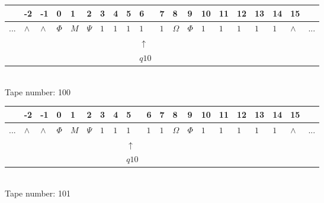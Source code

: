 \documentclass[11pt]{article}
\begin{document}
\begin{table}[H]
\centering
\begin{tabular}{llllllllllllllllllll}
 & -2 & -1 & 0 & 1 & 2 & 3 & 4 & 5 & 6 & 7 & 8 & 9 & 10 & 11 & 12 & 13 & 14 & 15 & \\
\hline
$...$ & \multicolumn{1}{|l|}{$\wedge$} & \multicolumn{1}{|l|}{$\wedge$} & \multicolumn{1}{|l|}{$\Phi$} & \multicolumn{1}{|l|}{$M$} & \multicolumn{1}{|l|}{$\Psi$} & \multicolumn{1}{|l|}{$1$} & \multicolumn{1}{|l|}{$1$} & \multicolumn{1}{|l|}{$1$} & \multicolumn{1}{|l|}{$1$} & \multicolumn{1}{|l|}{$1$} & \multicolumn{1}{|l|}{$\Omega$} & \multicolumn{1}{|l|}{$\Phi$} & \multicolumn{1}{|l|}{$1$} & \multicolumn{1}{|l|}{$1$} & \multicolumn{1}{|l|}{$1$} & \multicolumn{1}{|l|}{$1$} & \multicolumn{1}{|l|}{$1$} & \multicolumn{1}{|l|}{$\wedge$} & $...$\\
\hline
&  &  &  &  &  &  &  &  & $\uparrow$ &  &  &  &  &  &  &  &  &  &  \\
&  &  &  &  &  &  &  &  & $ q10 $ &  &  &  &  &  &  &  &  &  &  \\
\end{tabular}
\\
Tape number: 100
\noindent\makebox[\linewidth]{\hdashrule{\textwidth}{1pt}{1pt}}\end{table}

\begin{table}[H]
\centering
\begin{tabular}{llllllllllllllllllll}
 & -2 & -1 & 0 & 1 & 2 & 3 & 4 & 5 & 6 & 7 & 8 & 9 & 10 & 11 & 12 & 13 & 14 & 15 & \\
\hline
$...$ & \multicolumn{1}{|l|}{$\wedge$} & \multicolumn{1}{|l|}{$\wedge$} & \multicolumn{1}{|l|}{$\Phi$} & \multicolumn{1}{|l|}{$M$} & \multicolumn{1}{|l|}{$\Psi$} & \multicolumn{1}{|l|}{$1$} & \multicolumn{1}{|l|}{$1$} & \multicolumn{1}{|l|}{$1$} & \multicolumn{1}{|l|}{$1$} & \multicolumn{1}{|l|}{$1$} & \multicolumn{1}{|l|}{$\Omega$} & \multicolumn{1}{|l|}{$\Phi$} & \multicolumn{1}{|l|}{$1$} & \multicolumn{1}{|l|}{$1$} & \multicolumn{1}{|l|}{$1$} & \multicolumn{1}{|l|}{$1$} & \multicolumn{1}{|l|}{$1$} & \multicolumn{1}{|l|}{$\wedge$} & $...$\\
\hline
&  &  &  &  &  &  &  & $\uparrow$ &  &  &  &  &  &  &  &  &  &  &  \\
&  &  &  &  &  &  &  & $ q10 $ &  &  &  &  &  &  &  &  &  &  &  \\
\end{tabular}
\\
Tape number: 101
\noindent\makebox[\linewidth]{\hdashrule{\textwidth}{1pt}{1pt}}\end{table}
\clearpage
\end{document}
